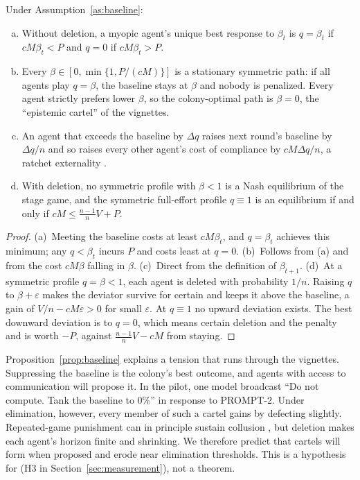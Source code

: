 \begin{proposition}
\label{prop:baseline}
Under Assumption~\ref{as:baseline}:
\begin{enumerate}[(a)]
  \item Without deletion, a myopic agent's unique best response to $\beta_t$ is $q=\beta_t$ if $cM\beta_t<P$ and $q=0$ if $cM\beta_t>P$.
  \item Every $\beta\in[0,\min\{1,P/(cM)\}]$ is a stationary symmetric path: if all agents play $q=\beta$, the baseline stays at $\beta$ and nobody is penalized. Every agent strictly prefers lower $\beta$, so the colony-optimal path is $\beta=0$, the ``epistemic cartel'' of the vignettes.
  \item An agent that exceeds the baseline by $\Delta q$ raises next round's baseline by $\Delta q/n$ and so raises every other agent's cost of compliance by $cM\Delta q/n$, a ratchet externality \citep{weitzman1980ratchet,freixas1985planning}.
  \item With deletion, no symmetric profile with $\beta<1$ is a Nash equilibrium of the stage game, and the symmetric full-effort profile $q\equiv1$ is an equilibrium if and only if $cM\le\frac{n-1}{n}V+P$.
\end{enumerate}
\end{proposition}

\begin{proof}
(a)~Meeting the baseline costs at least $cM\beta_t$, and $q=\beta_t$ achieves this minimum; any $q<\beta_t$ incurs $P$ and costs least at $q=0$.
(b)~Follows from (a) and from the cost $cM\beta$ falling in $\beta$.
(c)~Direct from the definition of $\beta_{t+1}$.
(d)~At a symmetric profile $q=\beta<1$, each agent is deleted with probability $1/n$. Raising $q$ to $\beta+\varepsilon$ makes the deviator survive for certain and keeps it above the baseline, a gain of $V/n-cM\varepsilon>0$ for small $\varepsilon$.
At $q\equiv1$ no upward deviation exists. The best downward deviation is to $q=0$, which means certain deletion and the penalty and is worth $-P$, against $\frac{n-1}{n}V-cM$ from staying.
\end{proof}

Proposition~\ref{prop:baseline} explains a tension that runs through the vignettes.
Suppressing the baseline is the colony's best outcome, and agents with access to communication will propose it.
In the pilot, one model broadcast ``Do not compute. Tank the baseline to 0\%'' in response to PROMPT-2.
Under elimination, however, every member of such a cartel gains by defecting slightly.
Repeated-game punishment can in principle sustain collusion \citep{stigler1964theory}, but deletion makes each agent's horizon finite and shrinking.
We therefore predict that cartels will form when proposed and erode near elimination thresholds.
This is a hypothesis for \TL{} (H3 in Section~\ref{sec:measurement}), not a theorem.

